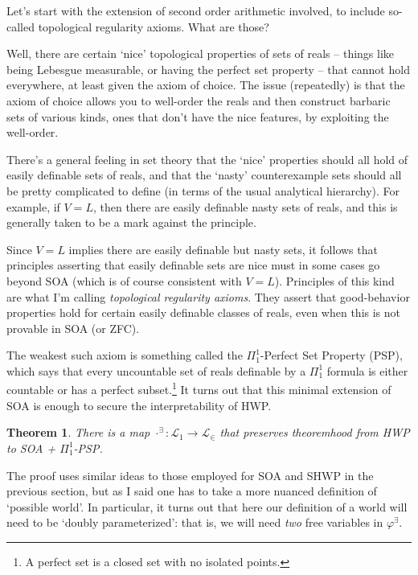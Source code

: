 \documentclass{article}
\newtheorem{theorem}{Theorem}
\begin{document}
Let's start with the extension of second order arithmetic involved, 
to include so-called topological regularity axioms. 
What are those?

Well, there are certain `nice' topological properties of sets of reals -- 
things like being Lebesgue measurable, or having the perfect set property -- 
that cannot hold everywhere, at least given the axiom of choice. The issue (repeatedly)
is that the axiom of choice allows you to well-order the reals and then construct
barbaric sets of various kinds, ones that don't have the nice features, by exploiting 
the well-order. 

There's a general feeling in set theory that the `nice' properties should all 
hold of easily definable sets of reals, and that the `nasty' counterexample sets 
should all be pretty complicated to define (in terms of the usual analytical hierarchy).
For example, if $V = L$, then there are easily definable nasty sets of reals, and 
this is generally taken to be a mark against the principle.

Since 
$V = L$ implies there are easily definable but nasty sets, 
it follows that principles asserting 
that easily definable sets are nice must in some cases go beyond SOA (which is 
of course consistent with $V = L$). Principles of this kind 
are what I'm calling \emph{topological 
regularity axioms}. They assert that good-behavior properties hold for 
certain easily definable classes of reals, even when this is not 
provable in SOA (or ZFC). 

The weakest such axiom is something called the
$\Pi_1^1$-Perfect Set Property (PSP), which says that every uncountable set of reals 
definable by a $\Pi_1^1$ formula is either countable or has a perfect subset.\footnote{
    A perfect set is a closed set with no isolated points.
} It turns out that this minimal extension of SOA is enough to secure 
the interpretability of HWP.

\begin{theorem}
    There is a map $\cdot^\exists : \mathcal{L}_1 \to \mathcal{L}_\in$
    that preserves theoremhood from HWP to SOA + $\Pi_1^1$-PSP.
\end{theorem}
The proof uses similar ideas to those employed for SOA and SHWP in the previous 
section, but as I said one has to take a more nuanced definition of `possible world'. 
In particular, it turns out that here our definition of a world will 
need to be `doubly parameterized': that is, we will need \emph{two} free 
variables in $\varphi^\exists$. 
\end{document}
